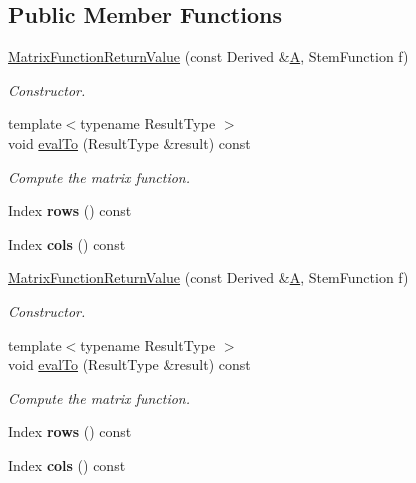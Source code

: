 \subsection*{Public Member Functions}
\begin{DoxyCompactItemize}
\item 
\hyperlink{class_eigen_1_1_matrix_function_return_value_af193d7a3e1b4e65dc70e64eb4bc8e17f}{Matrix\+Function\+Return\+Value} (const Derived \&\hyperlink{group___core___module_class_eigen_1_1_matrix}{A}, Stem\+Function f)
\begin{DoxyCompactList}\small\item\em Constructor. \end{DoxyCompactList}\item 
{\footnotesize template$<$typename Result\+Type $>$ }\\void \hyperlink{class_eigen_1_1_matrix_function_return_value_a202d594ae254e3ea5420ff95d9f03a67}{eval\+To} (Result\+Type \&result) const
\begin{DoxyCompactList}\small\item\em Compute the matrix function. \end{DoxyCompactList}\item 
\mbox{\label{class_eigen_1_1_matrix_function_return_value_a0cdf35cbef496858b738e85055199f51}} 
Index {\bfseries rows} () const
\item 
\mbox{\label{class_eigen_1_1_matrix_function_return_value_a9ed627acab1f8b40cc55e7ce47a88db4}} 
Index {\bfseries cols} () const
\item 
\hyperlink{class_eigen_1_1_matrix_function_return_value_af193d7a3e1b4e65dc70e64eb4bc8e17f}{Matrix\+Function\+Return\+Value} (const Derived \&\hyperlink{group___core___module_class_eigen_1_1_matrix}{A}, Stem\+Function f)
\begin{DoxyCompactList}\small\item\em Constructor. \end{DoxyCompactList}\item 
{\footnotesize template$<$typename Result\+Type $>$ }\\void \hyperlink{class_eigen_1_1_matrix_function_return_value_a202d594ae254e3ea5420ff95d9f03a67}{eval\+To} (Result\+Type \&result) const
\begin{DoxyCompactList}\small\item\em Compute the matrix function. \end{DoxyCompactList}\item 
\mbox{\label{class_eigen_1_1_matrix_function_return_value_a0cdf35cbef496858b738e85055199f51}} 
Index {\bfseries rows} () const
\item 
\mbox{\label{class_eigen_1_1_matrix_function_return_value_a9ed627acab1f8b40cc55e7ce47a88db4}} 
Index {\bfseries cols} () const
\end{DoxyCompactItemize}
